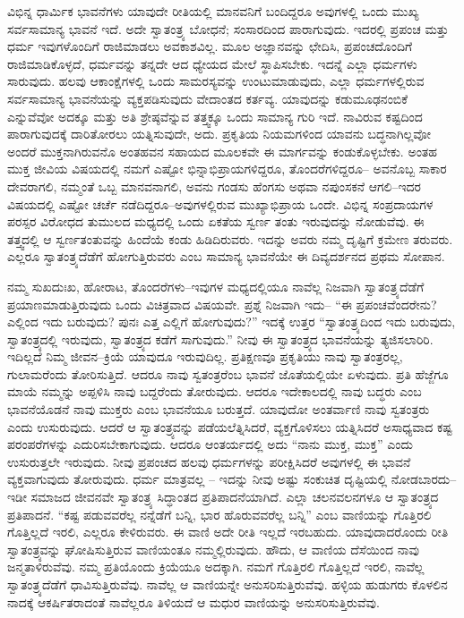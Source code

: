 ವಿಭಿನ್ನ ಧಾರ್ಮಿಕ ಭಾವನೆಗಳು ಯಾವುದೇ ರೀತಿಯಲ್ಲಿ ಮಾನವನಿಗೆ ಬಂದಿದ್ದರೂ ಅವುಗಳಲ್ಲಿ ಒಂದು ಮುಖ್ಯ ಸರ್ವಸಾಮಾನ್ಯ ಭಾವನೆ ಇದೆ. ಅದೇ ಸ್ವಾತಂತ್ರ್ಯ ಬೋಧನೆ; ಸಂಸಾರದಿಂದ ಪಾರಾಗುವುದು. ಇದರಲ್ಲಿ ಪ್ರಪಂಚ ಮತ್ತು ಧರ್ಮ ಇವುಗಳೊಂದಿಗೆ ರಾಜಿಮಾಡಲು ಅವಕಾಶವಿಲ್ಲ. ಮೂಲ ಅಜ್ಞಾನವನ್ನು ಛೇದಿಸಿ, ಪ್ರಪಂಚದೊಂದಿಗೆ ರಾಜಿಮಾಡಿಕೊಳ್ಳದೆ, ಧರ್ಮವನ್ನು ತನ್ನದೇ ಆದ ಧ್ಯೇಯದ ಮೇಲೆ ಸ್ಥಾಪಿಸಬೇಕು. ಇದನ್ನೆ ಎಲ್ಲಾ ಧರ್ಮಗಳು ಸಾರುವುದು. ಹಲವು ಆಕಾಂಕ್ಷೆಗಳಲ್ಲಿ ಒಂದು ಸಾಮರಸ್ಯವನ್ನು ಉಂಟುಮಾಡುವುದು, ಎಲ್ಲಾ ಧರ್ಮಗಳಲ್ಲಿರುವ ಸರ್ವಸಾಮಾನ್ಯ ಭಾವನೆಯನ್ನು ವ್ಯಕ್ತಪಡಿಸುವುದು ವೇದಾಂತದ ಕರ್ತವ್ಯ. ಯಾವುದನ್ನು ಕಡುಮೂಢನಂಬಿಕೆ ಎನ್ನುವೆವೋ ಅದಕ್ಕೂ ಮತ್ತು ಅತಿ ಶ್ರೇಷ್ಠವೆನ್ನುವ ತತ್ತ್ವಕ್ಕೂ ಒಂದು ಸಾಮಾನ್ಯ ಗುರಿ ಇದೆ. ನಾವಿರುವ ಕಷ್ಟದಿಂದ ಪಾರಾಗುವುದಕ್ಕೆ ದಾರಿತೋರಲು ಯತ್ನಿಸುವುದೇ, ಅದು. ಪ್ರಕೃತಿಯ ನಿಯಮಗಳಿಂದ ಯಾವನು ಬದ್ಧನಾಗಿಲ್ಲವೋ ಅಂದರೆ ಮುಕ್ತನಾಗಿರುವನೊ ಅಂತಹವನ ಸಹಾಯದ ಮೂಲಕವೇ ಈ ಮಾರ್ಗವನ್ನು ಕಂಡುಕೊಳ್ಳಬೇಕು. ಅಂತಹ ಮುಕ್ತ ಜೀವಿಯ ವಿಷಯದಲ್ಲಿ ನಮಗೆ ಎಷ್ಟೋ ಭಿನ್ನಾಭಿಪ್ರಾಯಗಳಿದ್ದರೂ, ತೊಂದರೆಗಳಿದ್ದರೂ– ಅವನೊಬ್ಬ ಸಾಕಾರ ದೇವರಾಗಲಿ, ನಮ್ಮಂತೆ ಒಬ್ಬ ಮಾನವನಾಗಲಿ, ಅವನು ಗಂಡಸು ಹೆಂಗಸು ಅಥವಾ ನಪುಂಸಕನೆ ಆಗಲಿ–ಇದರ ವಿಷಯದಲ್ಲಿ ಎಷ್ಟೋ ಚರ್ಚೆ ನಡೆದಿದ್ದರೂ–ಅವುಗಳಲ್ಲಿರುವ ಮುಖ್ಯಾಭಿಪ್ರಾಯ ಒಂದೇ. ವಿಭಿನ್ನ ಸಂಪ್ರದಾಯಗಳ ಪರಸ್ಪರ ವಿರೋಧದ ತುಮುಲದ ಮಧ್ಯದಲ್ಲಿ ಒಂದು ಏಕತೆಯ ಸ್ವರ್ಣ ತಂತು ಇರುವುದನ್ನು ನೋಡುವೆವು. ಈ ತತ್ತ್ವದಲ್ಲಿ ಆ ಸ್ವರ್ಣತಂತುವನ್ನು ಹಿಂದೆಯೆ ಕಂಡು ಹಿಡಿದಿರುವರು. ಇದನ್ನು ಅವರು ನಮ್ಮ ದೃಷ್ಟಿಗೆ ಕ್ರಮೇಣ ತರುವರು. ಎಲ್ಲರೂ ಸ್ವಾತಂತ್ರ್ಯದೆಡೆಗೆ ಹೋಗುತ್ತಿರುವರು ಎಂಬ ಸಾಮಾನ್ಯ ಭಾವನೆಯೇ ಈ ದಿವ್ಯದರ್ಶನದ ಪ್ರಥಮ ಸೋಪಾನ.

ನಮ್ಮ ಸುಖದುಃಖ, ಹೋರಾಟ, ತೊಂದರೆಗಳು–ಇವುಗಳ ಮಧ್ಯದಲ್ಲಿಯೂ ನಾವೆಲ್ಲ ನಿಜವಾಗಿ ಸ್ವಾತಂತ್ರ್ಯದೆಡೆಗೆ ಪ್ರಯಾಣಮಾಡುತ್ತಿರುವುದು ಒಂದು ವಿಚಿತ್ರವಾದ ವಿಷಯವೇ. ಪ್ರಶ್ನೆ ನಿಜವಾಗಿ ಇದು– “ಈ ಪ್ರಪಂಚವೆಂದರೇನು? ಎಲ್ಲಿಂದ ಇದು ಬರುವುದು? ಪುನಃ ಎತ್ತ ಎಲ್ಲಿಗೆ ಹೋಗುವುದು?” ಇದಕ್ಕೆ ಉತ್ತರ “ಸ್ವಾತಂತ್ರ್ಯದಿಂದ ಇದು ಬರುವುದು, ಸ್ವಾತಂತ್ರ್ಯದಲ್ಲಿ ಇರುವುದು, ಸ್ವಾತಂತ್ರ್ಯದ ಕಡೆಗೆ ಸಾಗುವುದು.” ನೀವು ಈ ಸ್ವಾತಂತ್ರ್ಯದ ಭಾವನೆಯನ್ನು ತ್ಯಜಿಸಲಾರಿರಿ. ಇದಿಲ್ಲದೆ ನಿಮ್ಮ ಜೀವನ–ಕ್ರಿಯೆ ಯಾವುದೂ ಇರುವುದಿಲ್ಲ. ಪ್ರತಿಕ್ಷಣವೂ ಪ್ರಕೃತಿಯು ನಾವು ಸ್ವಾತಂತ್ರರಲ್ಲ, ಗುಲಾಮರೆಂದು ತೋರಿಸುತ್ತಿದೆ. ಆದರೂ ನಾವು ಸ್ವತಂತ್ರರೆಂಬ ಭಾವನೆ ಜೊತೆಯಲ್ಲಿಯೇ ಏಳುವುದು. ಪ್ರತಿ ಹೆಜ್ಜೆಗೂ ಮಾಯೆ ನಮ್ಮನ್ನು ಅಪ್ಪಳಿಸಿ ನಾವು ಬದ್ದರೆಂದು ತೋರುವುದು. ಆದರೂ ಇದೇ\break ಕಾಲದಲ್ಲಿ ನಾವು ಬದ್ಧರು ಎಂಬ ಭಾವನೆಯೊಡನೆ ನಾವು ಮುಕ್ತರು ಎಂಬ ಭಾವನೆಯೂ ಬರುತ್ತದೆ. ಯಾವುದೋ ಅಂತರ್ವಾಣಿ ನಾವು ಸ್ವತಂತ್ರರು ಎಂದು ಉಸುರುವುದು. ಆದರೆ ಆ ಸ್ವಾತಂತ್ರ್ಯವನ್ನು ಪಡೆಯಲೆತ್ನಿಸಿದರೆ, ವ್ಯಕ್ತಗೊಳಿಸಲು ಯತ್ನಿಸಿದರೆ ಅಸಾಧ್ಯವಾದ ಕಷ್ಟ ಪರಂಪರೆಗಳನ್ನು ಎದುರಿಸಬೇಕಾಗುವುದು. ಆದರೂ ಆಂತರ್ಯದಲ್ಲಿ ಅದು “ನಾನು ಮುಕ್ತ, ಮುಕ್ತ” ಎಂದು ಉಸುರುತ್ತಲೇ ಇರುವುದು. ನೀವು ಪ್ರಪಂಚದ ಹಲವು ಧರ್ಮಗಳನ್ನು ಪರೀಕ್ಷಿಸಿದರೆ ಅವುಗಳಲ್ಲಿ ಈ ಭಾವನೆ ವ್ಯಕ್ತವಾಗುವುದು ತೋರುವುದು. ಧರ್ಮ ಮಾತ್ರವಲ್ಲ – ಇದನ್ನು ನೀವು ಅಷ್ಟು ಸಂಕುಚಿತ ದೃಷ್ಟಿಯಲ್ಲಿ ನೋಡಬಾರದು–ಇಡೀ ಸಮಾಜದ ಜೀವನವೇ ಸ್ವಾತಂತ್ರ್ಯ ಸಿದ್ಧಾಂತದ ಪ್ರತಿಪಾದನೆಯಾಗಿದೆ. ಎಲ್ಲಾ ಚಲನವಲನಗಳೂ ಆ ಸ್ವಾತಂತ್ರ್ಯದ ಪ್ರತಿಪಾದನೆ. “ಕಷ್ಟ ಪಡುವವರೆಲ್ಲ ನನ್ನೆಡೆಗೆ ಬನ್ನಿ, ಭಾರ ಹೊರುವವರೆಲ್ಲ ಬನ್ನಿ” ಎಂಬ ವಾಣಿಯನ್ನು ಗೊತ್ತಿರಲಿ ಗೊತ್ತಿಲ್ಲದೆ ಇರಲಿ, ಎಲ್ಲರೂ ಕೇಳಿರುವರು. ಈ ವಾಣಿ ಅದೇ ರೀತಿ ಇಲ್ಲದೆ ಇರಬಹುದು. ಯಾವುದಾದರೊಂದು ರೀತಿ ಸ್ವಾತಂತ್ರ್ಯವನ್ನು ಘೋಷಿಸುತ್ತಿರುವ ವಾಣಿಯಂತೂ ನಮ್ಮಲ್ಲಿರುವುದು. ಹೌದು, ಆ ವಾಣಿಯ ದೆಸೆಯಿಂದ ನಾವು ಜನ್ಮತಾಳಿರುವೆವು. ನಮ್ಮ ಪ್ರತಿಯೊಂದು ಕ್ರಿಯೆಯೂ ಅದಕ್ಕಾಗಿ. ನಮಗೆ ಗೊತ್ತಿರಲಿ ಗೊತ್ತಿಲ್ಲದೆ ಇರಲಿ, ನಾವೆಲ್ಲ ಸ್ವಾತಂತ್ರ್ಯದೆಡೆಗೆ ಧಾವಿಸುತ್ತಿರುವೆವು. ನಾವೆಲ್ಲ ಆ ವಾಣಿಯನ್ನೇ ಅನುಸರಿಸುತ್ತಿರುವೆವು. ಹಳ್ಳಿಯ ಹುಡುಗರು ಕೊಳಲಿನ ನಾದಕ್ಕೆ ಆಕರ್ಷಿತರಾದಂತೆ ನಾವೆಲ್ಲರೂ ತಿಳಿಯದೆ ಆ ಮಧುರ ವಾಣಿಯನ್ನು ಅನುಸರಿಸುತ್ತಿರುವೆವು.

